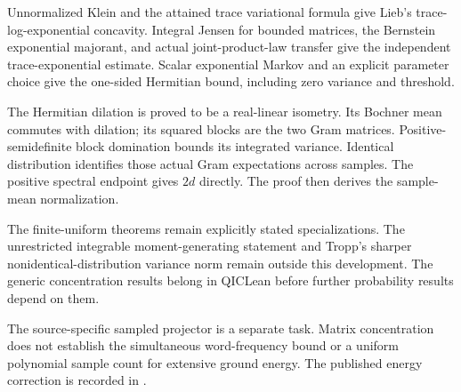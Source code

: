\documentclass{article}
\begin{document}
Unnormalized Klein and the attained trace variational formula give Lieb's
trace-log-exponential concavity. Integral Jensen for bounded matrices, the
Bernstein exponential majorant, and actual joint-product-law transfer give
the independent trace-exponential estimate. Scalar exponential Markov and an
explicit parameter choice give the one-sided Hermitian bound, including zero
variance and threshold.

The Hermitian dilation is proved to be a real-linear isometry. Its Bochner mean
commutes with dilation; its squared blocks are the two Gram matrices.
Positive-semidefinite block domination bounds its integrated variance. Identical
distribution identifies those actual Gram expectations across samples. The
positive spectral endpoint gives $2d$ directly. The proof then derives the
sample-mean normalization.

The finite-uniform theorems remain explicitly stated specializations.
The unrestricted integrable moment-generating statement and Tropp's sharper
nonidentical-distribution variance norm remain outside this development.
The generic concentration results belong in QICLean before further probability
results depend on them.

The source-specific sampled projector is a separate task. Matrix concentration
does not establish the simultaneous word-frequency bound or a uniform polynomial
sample count for extensive ground energy. The published energy correction is
recorded in .
\end{document}
